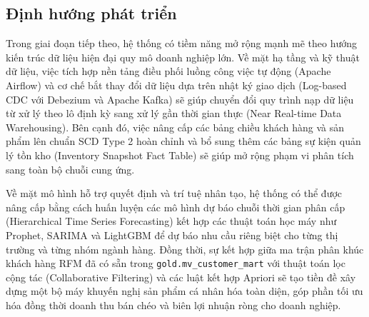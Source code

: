 \subsection{Định hướng phát triển}

Trong giai đoạn tiếp theo, hệ thống có tiềm năng mở rộng mạnh mẽ theo hướng kiến trúc dữ liệu hiện đại quy mô doanh nghiệp lớn. Về mặt hạ tầng và kỹ thuật dữ liệu, việc tích hợp nền tảng điều phối luồng công việc tự động (Apache Airflow) và cơ chế bắt thay đổi dữ liệu dựa trên nhật ký giao dịch (Log-based CDC với Debezium và Apache Kafka) sẽ giúp chuyển đổi quy trình nạp dữ liệu từ xử lý theo lô định kỳ sang xử lý gần thời gian thực (Near Real-time Data Warehousing). Bên cạnh đó, việc nâng cấp các bảng chiều khách hàng và sản phẩm lên chuẩn SCD Type 2 hoàn chỉnh và bổ sung thêm các bảng sự kiện quản lý tồn kho (Inventory Snapshot Fact Table) sẽ giúp mở rộng phạm vi phân tích sang toàn bộ chuỗi cung ứng.

Về mặt mô hình hỗ trợ quyết định và trí tuệ nhân tạo, hệ thống có thể được nâng cấp bằng cách huấn luyện các mô hình dự báo chuỗi thời gian phân cấp (Hierarchical Time Series Forecasting) kết hợp các thuật toán học máy như Prophet, SARIMA và LightGBM để dự báo nhu cầu riêng biệt cho từng thị trường và từng nhóm ngành hàng. Đồng thời, sự kết hợp giữa ma trận phân khúc khách hàng RFM đã có sẵn trong \texttt{gold.mv\_customer\_mart} với thuật toán lọc cộng tác (Collaborative Filtering) và các luật kết hợp Apriori sẽ tạo tiền đề xây dựng một bộ máy khuyến nghị sản phẩm cá nhân hóa toàn diện, góp phần tối ưu hóa đồng thời doanh thu bán chéo và biên lợi nhuận ròng cho doanh nghiệp.
